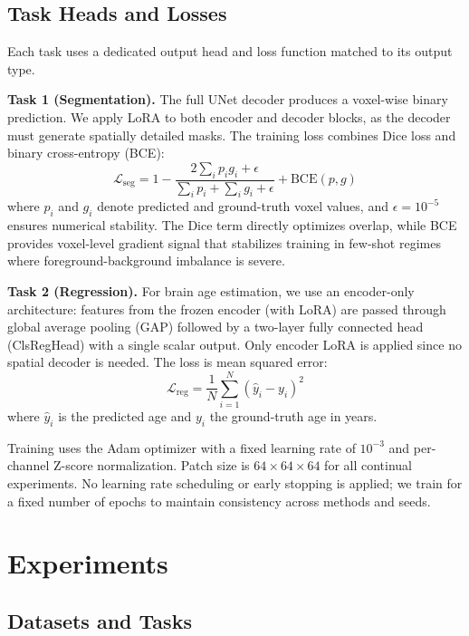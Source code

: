\documentclass[journal,twoside,web]{ieeecolor}
\begin{document}
\subsection{Task Heads and Losses}
\label{sec:heads}

Each task uses a dedicated output head and loss function matched to its output type.

\textbf{Task 1 (Segmentation).} The full UNet decoder produces a voxel-wise binary prediction. We apply LoRA to both encoder and decoder blocks, as the decoder must generate spatially detailed masks. The training loss combines Dice loss and binary cross-entropy (BCE):
\begin{equation}
\mathcal{L}_{\text{seg}} = 1 - \frac{2 \sum_i p_i g_i + \epsilon}{\sum_i p_i + \sum_i g_i + \epsilon} + \text{BCE}(p, g)
\end{equation}
where $p_i$ and $g_i$ denote predicted and ground-truth voxel values, and $\epsilon=10^{-5}$ ensures numerical stability. The Dice term directly optimizes overlap, while BCE provides voxel-level gradient signal that stabilizes training in few-shot regimes where foreground-background imbalance is severe.

\textbf{Task 2 (Regression).} For brain age estimation, we use an encoder-only architecture: features from the frozen encoder (with LoRA) are passed through global average pooling (GAP) followed by a two-layer fully connected head (ClsRegHead) with a single scalar output. Only encoder LoRA is applied since no spatial decoder is needed. The loss is mean squared error:
\begin{equation}
\mathcal{L}_{\text{reg}} = \frac{1}{N} \sum_{i=1}^{N} (\hat{y}_i - y_i)^2
\end{equation}
where $\hat{y}_i$ is the predicted age and $y_i$ the ground-truth age in years.

Training uses the Adam optimizer with a fixed learning rate of $10^{-3}$ and per-channel Z-score normalization. Patch size is $64\times64\times64$ for all continual experiments. No learning rate scheduling or early stopping is applied; we train for a fixed number of epochs to maintain consistency across methods and seeds.

\section{Experiments}
\label{sec:experiments}

\subsection{Datasets and Tasks}
\label{sec:data}
\end{document}
